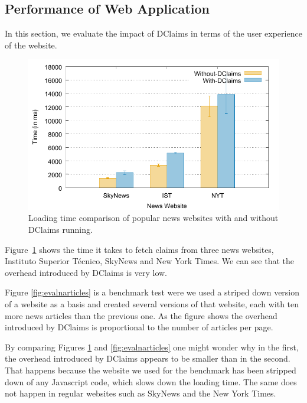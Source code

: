 \subsection{Performance of Web Application}


In this section, we evaluate the impact of DClaims in terms of the user experience of the website. 

\begin{figure}[t]
  \centering
  \includegraphics[width=\columnwidth]{final-figures/website-3-comparison.pdf}
  \vspace{-10pt}
  \caption{Loading time comparison of popular news websites with and without DClaims running.}
  \label{fig:evalwebpage}
\end{figure}

 Figure~\ref{fig:evalwebpage} shows the time it takes to fetch claims from three news websites, Instituto Superior Técnico, SkyNews and New York Times. We can see that the overhead introduced by DClaims is very low.

Figure \ref{fig:evalnarticles} is a benchmark test were we used a striped down version of a website as a basis and created several versions of that website, each with ten more news articles than the previous one. As the figure shows the overhead introduced by DClaims is proportional to the number of articles per page.

By comparing Figures \ref{fig:evalwebpage} and \ref{fig:evalnarticles} one might wonder why in the first, the overhead introduced by DClaims appears to be smaller than in the second. That happens because the website we used for the benchmark has been stripped down of any Javascript code, which slows down the loading time. The same does not happen in regular websites such as SkyNews and the New York Times. 

